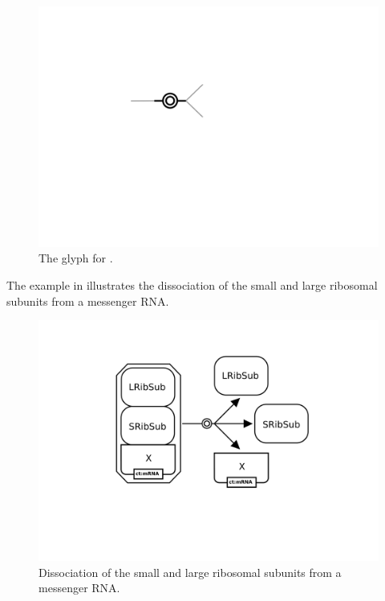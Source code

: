 \begin{figure}[htb]
  \centering
  \includegraphics[scale = 0.5]{images/dissociation}
  \caption{The \PD glyph for .}
  \label{fig:techref:dissociation}
\end{figure}

The example in  illustrates the dissociation of the small and large ribosomal subunits from a messenger RNA.

\begin{figure}[htb]
  \centering
  \includegraphics[scale = 0.3]{examples/dissociation-ribosome}
  \caption{Dissociation of the small and large ribosomal subunits from a messenger RNA.}
  \label{fig:techref:dissoc-ribo}
\end{figure}

